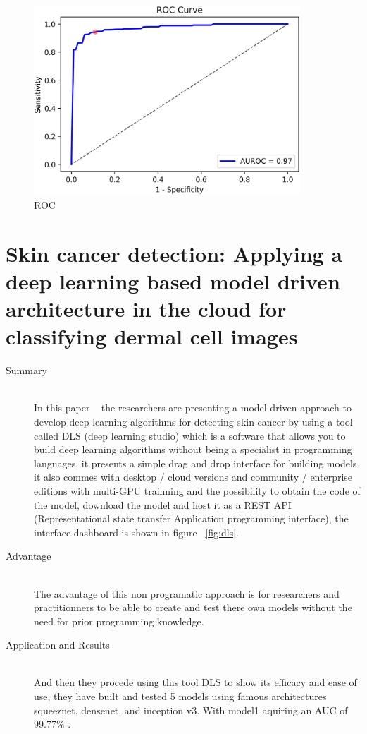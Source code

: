 \begin{figure}[htbp]
\begin{center}
\includegraphics[width=10cm]{./chapter-03-state-of-the-art/ROC.png}
\end{center}
\caption{ROC}
\label{fig:roc}
\end{figure}







\section{Skin cancer detection: Applying a deep learning based model driven architecture in the cloud for classifying dermal cell images}
\begin{description}
\item[Summary] \hfill \\
In this paper ~\cite{Kadampur2020} the researchers are presenting a model driven approach to develop deep learning algorithms for detecting skin cancer by using a tool called DLS (deep learning studio) which is a software that allows you to build deep learning algorithms without being a specialist in programming languages, it presents a simple drag and drop interface for building models it also commes with desktop / cloud versions and community / enterprise editions with multi-GPU trainning and the possibility to obtain the code of the model, download the model and host it as a REST API (Representational state transfer Application programming interface), the interface dashboard is shown in figure ~\ref{fig:dls}.
\item[Advantage] \hfill \\
The advantage of this non programatic approach is for researchers and practitionners to be able to create and test there own models without the need for prior programming knowledge.
\item[Application and Results] \hfill \\
And then they procede using this tool DLS to show its efficacy and ease of use, they have built and tested 5 models using famous architectures squeeznet, densenet, and inception v3.
With model1 aquiring an AUC of 99.77\% .
\end{description}


